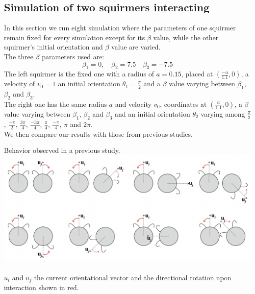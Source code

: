 \documentclass{article}
\begin{document}
\subsection{Simulation of two squirmers interacting}
In this section we run eight simulation where the parameters of one squirmer remain fixed for every simulation 
except for its $\beta$ value, while the other squirmer's 
initial orientation and $\beta$ value are varied.\\
The three $\beta$ parameters used are:
\begin{equation*}
   \beta_1 = 0, \quad \beta_2 = 7.5 \quad \beta_3 = -7.5
\end{equation*}
The left squirmer is the fixed one with a radius of $a=0.15$, placed at $(\frac{-a}{1.1}, 0)$, a velocity of $v_0 = 1$
 an initial orientation $\theta_1 = \frac{\pi}{2}$ and a $\beta$ value varying between $\beta_1$, $\beta_2$ and $\beta_3$.\\
The right one has the same radius $a$ and velocity $v_0$, coordinates at $(\frac{a}{1.1}, 0)$,
 a $\beta$ value varying between $\beta_1$, $\beta_2$ and $\beta_3$ and an initial orientation $\theta_2$ varying among
 $\frac{\pi}{2}$, $\frac{-\pi}{2}$, $\frac{3\pi}{4}$, $\frac{-3\pi}{4}$, $\frac{\pi}{4}$, $\frac{-\pi}{4}$, $\pi$ and $2\pi$.\\
We then compare our results with those from previous studies.
\begin{center}
   Behavior observed in a previous study.
   \includegraphics[width=1\textwidth]{Presentation/V0/images/stark_behavior.png}\\
   \cite{Stark}\\
   $u_i$ and $u_j$ the current orientational vector and the directional rotation upon interaction shown in red.  
\end{center}
\end{document}
